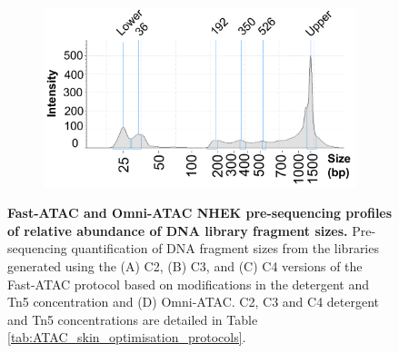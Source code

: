 \begin{figure}[htbp]
\begin{subfigure}{0.48\textwidth}
\caption{\textbf{}} %
\end{subfigure}%
\begin{subfigure}{0.48\textwidth}
\centering
\includegraphics[width=\textwidth]{./Appendix/pdfs/Chapter3/Omni_ATAC_NHEK_Rep1_tapestation}
\caption{\textbf{}} %
\end{subfigure}
\hfill
\caption[Fast-ATAC and Omni-ATAC NHEK pre-sequencing profiles of relative abundance of DNA library fragment sizes.]{\textbf{Fast-ATAC and Omni-ATAC NHEK pre-sequencing profiles of relative abundance of DNA library fragment sizes.} Pre-sequencing quantification of DNA fragment sizes from the libraries generated  using the (A) C2, (B) C3, and (C) C4 versions of the Fast-ATAC protocol based on modifications in the detergent and Tn5 concentration and (D) Omni-ATAC. C2, C3 and C4 detergent and Tn5 concentrations are detailed in Table \ref{tab:ATAC_skin_optimisation_protocols}.}
\label{figure:NHEK_tapestation}
\end{figure}


